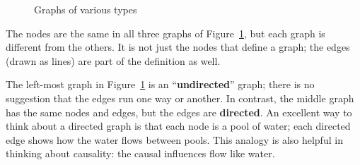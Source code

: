 \documentclass[
  letterpaper,
  DIV=11,
  numbers=noendperiod,
  oneside]{scrreprt}
\begin{document}
\begin{figure}

\begin{minipage}[t]{0.33\linewidth}

{\centering 


}

\end{minipage}%
%
\begin{minipage}[t]{0.33\linewidth}

{\centering 


}

\end{minipage}%
%
\begin{minipage}[t]{0.33\linewidth}

{\centering 


}

\end{minipage}%

\caption{\label{fig-graphs}Graphs of various types}

\end{figure}

The nodes are the same in all three graphs of Figure~\ref{fig-graphs},
but each graph is different from the others. It is not just the nodes
that define a graph; the edges (drawn as lines) are part of the
definition as well.

The left-most graph in Figure~\ref{fig-graphs} is an
``\textbf{undirected}'' graph; there is no suggestion that the edges run
one way or another. In contrast, the middle graph has the same nodes and
edges, but the edges are \textbf{directed}. An excellent way to think
about a directed graph is that each node is a pool of water; each
directed edge shows how the water flows between pools. This analogy is
also helpful in thinking about causality: the causal influences flow
like water.
\end{document}
